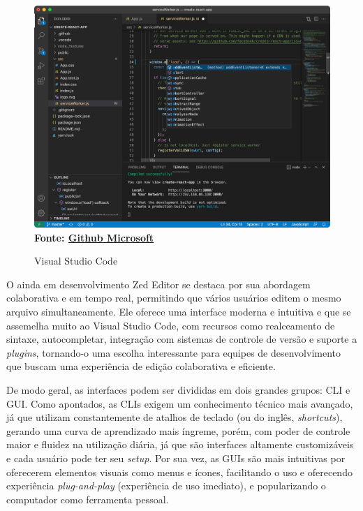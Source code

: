 \FloatBarrier
\begin{figure}[!htbp]
    \centering
    \caption{Visual Studio Code}
    \includegraphics[scale=0.3]{imagens/VSCode.png}
    \\\textbf{Fonte: \href{https://github.com/microsoft/vscode}{Github Microsoft}} \label{fig:VSCode}
\end{figure}
\FloatBarrier

O ainda em desenvolvimento Zed Editor se destaca por sua abordagem colaborativa
e em tempo real, permitindo que vários usuários editem o mesmo arquivo
simultaneamente. Ele oferece uma interface moderna e intuitiva e que se assemelha
muito ao Visual Studio Code, com recursos como realceamento de sintaxe, autocompletar,
integração com sistemas de controle de versão e suporte a \textit{plugins},
tornando-o uma escolha interessante para equipes de desenvolvimento que buscam
uma experiência de edição colaborativa e eficiente.

De modo geral, as interfaces podem ser divididas em dois grandes grupos: CLI e
GUI. Como apontados, as CLIs exigem um conhecimento técnico mais avançado, já que
utilizam constantemente de atalhos de teclado (ou do inglês, \textit{shortcuts}),
gerando uma curva de aprendizado mais íngreme, porém, com poder de controle
maior e fluidez na utilização diária, já que são interfaces altamente customizáveis
e cada usuário pode ter seu \textit{setup}. Por sua vez, as GUIs são mais
intuitivas por oferecerem elementos visuais como menus e ícones, facilitando o uso
e oferecendo experiência \textit{plug-and-play} (experiência de uso imediato), e
popularizando o computador como ferramenta pessoal.

